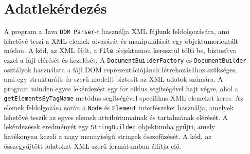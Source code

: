 \documentclass[12pt]{report}
\begin{document}
\section{Adatlekérdezés}
\indent\indent A program a Java \texttt{DOM Parser}-t használja XML fájlunk feldolgozására, ami lehetővé teszi a XML elemek olvasását és manipulálását egy objektumorientált módon. A kód, az XML fájlt, a \texttt{File} objektumon keresztül tölti be, biztosítva ezzel a fájl elérését és kezelését. A \texttt{DocumentBuilderFactory} és \texttt{DocumentBuilder} osztályok használata a fájl DOM reprezentációjának létrehozásához szükséges, ami egy strukturált, fa-szerű modellt biztosít az XML adatok számára. A program minden egyes lekérdezést egy for ciklus segítségével hajt végre, ahol a \texttt{getElementsByTagName} metódus segítségével specifikus XML elemeket keres. Az elemek feldolgozása során a \texttt{Node} és \texttt{Element} interfészeket használja, amelyek lehetővé teszik az egyes elemek attribútumainak és tartalmának elérését. A lekérdezések eredményét egy \texttt{StringBuilder} objektumba gyűjti, amely hatékonyan kezeli a nagy mennyiségű stringek összefűzését. A kód, az összegyűjtött adatokat XML-szerű formátumban állítja elő.\\
\end{document}
